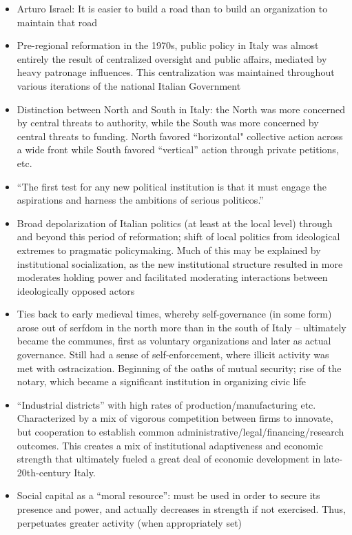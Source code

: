 \documentclass[12pt]{article}
\begin{document}
\begin{itemize}[leftmargin=*, itemsep=4pt]
    \item Arturo Israel: It is easier to build a road than to build an organization to maintain that road
    \item Pre-regional reformation in the 1970s, public policy in Italy was almost entirely the result of centralized oversight and public affairs, mediated by heavy patronage influences. This centralization was maintained throughout various iterations of the national Italian Government
    \item Distinction between North and South in Italy: the North was more concerned by central threats to authority, while the South was more concerned by central threats to funding. North favored ``horizontal" collective action across a wide front while South favored ``vertical'' action through private petitions, etc.
    \item ``The first test for any new political institution is that it must engage the aspirations and harness the ambitions of serious politicos.''
    \item Broad depolarization of Italian politics (at least at the local level) through and beyond this period of reformation; shift of local politics from ideological extremes to pragmatic policymaking. Much of this may be explained by institutional socialization, as the new institutional structure resulted in more moderates holding power and facilitated moderating interactions between ideologically opposed actors
    \item Ties back to early medieval times, whereby self-governance (in some form) arose out of serfdom in the north more than in the south of Italy -- ultimately became the communes, first as voluntary organizations and later as actual governance. Still had a sense of self-enforcement, where illicit activity was met with ostracization. Beginning of the oaths of mutual security; rise of the notary, which became a significant institution in organizing civic life
    \item ``Industrial districts'' with high rates of production/manufacturing etc. Characterized by a mix of vigorous competition between firms to innovate, but cooperation to establish common administrative/legal/financing/research outcomes. This creates a mix of institutional adaptiveness and economic strength that ultimately fueled a great deal of economic development in late-20th-century Italy.
    \item Social capital as a ``moral resource'': must be used in order to secure its presence and power, and actually decreases in strength if not exercised. Thus, perpetuates greater activity (when appropriately set)
\end{itemize}
\end{document}
